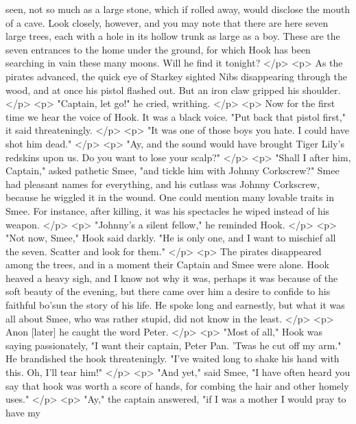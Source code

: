       seen, not so much as a large stone, which if rolled away, would disclose
      the mouth of a cave. Look closely, however, and you may note that there
      are here seven large trees, each with a hole in its hollow trunk as large
      as a boy. These are the seven entrances to the home under the ground, for
      which Hook has been searching in vain these many moons. Will he find it
      tonight?
    </p>
    <p>
      As the pirates advanced, the quick eye of Starkey sighted Nibs
      disappearing through the wood, and at once his pistol flashed out. But an
      iron claw gripped his shoulder.
    </p>
    <p>
      "Captain, let go!" he cried, writhing.
    </p>
    <p>
      Now for the first time we hear the voice of Hook. It was a black voice.
      "Put back that pistol first," it said threateningly.
    </p>
    <p>
      "It was one of those boys you hate. I could have shot him dead."
    </p>
    <p>
      "Ay, and the sound would have brought Tiger Lily's redskins upon us. Do
      you want to lose your scalp?"
    </p>
    <p>
      "Shall I after him, Captain," asked pathetic Smee, "and tickle him with
      Johnny Corkscrew?" Smee had pleasant names for everything, and his cutlass
      was Johnny Corkscrew, because he wiggled it in the wound. One could
      mention many lovable traits in Smee. For instance, after killing, it was
      his spectacles he wiped instead of his weapon.
    </p>
    <p>
      "Johnny's a silent fellow," he reminded Hook.
    </p>
    <p>
      "Not now, Smee," Hook said darkly. "He is only one, and I want to mischief
      all the seven. Scatter and look for them."
    </p>
    <p>
      The pirates disappeared among the trees, and in a moment their Captain and
      Smee were alone. Hook heaved a heavy sigh, and I know not why it was,
      perhaps it was because of the soft beauty of the evening, but there came
      over him a desire to confide to his faithful bo'sun the story of his life.
      He spoke long and earnestly, but what it was all about Smee, who was
      rather stupid, did not know in the least.
    </p>
    <p>
      Anon [later] he caught the word Peter.
    </p>
    <p>
      "Most of all," Hook was saying passionately, "I want their captain, Peter
      Pan. 'Twas he cut off my arm." He brandished the hook threateningly. "I've
      waited long to shake his hand with this. Oh, I'll tear him!"
    </p>
    <p>
      "And yet," said Smee, "I have often heard you say that hook was worth a
      score of hands, for combing the hair and other homely uses."
    </p>
    <p>
      "Ay," the captain answered, "if I was a mother I would pray to have my
